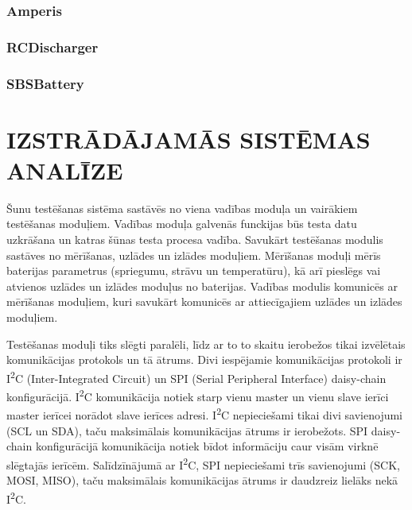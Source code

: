 \documentclass[12pt,fleqn,titlepage,oneside]{article}
\numberwithin{equation}{section}
\numberwithin{figure}{section}
\numberwithin{table}{section}
\begin{document}
\subsubsection{Amperis}

\subsubsection{RCDischarger}

\subsubsection{SBSBattery}

\clearpage
\section{\texorpdfstring{\MakeUppercase{Izstrādājamās sistēmas analīze}}{Izstrādājamās sistēmas analīze}}

Šunu testēšanas sistēma sastāvēs no viena vadības moduļa un vairākiem testēšanas moduļiem.
Vadības moduļa galvenās funckijas būs testa datu uzkrāšana un katras šūnas testa procesa vadība.
Savukārt testēšanas modulis sastāves no mērīšanas, uzlādes un izlādes moduļiem. Mērīšanas moduļi mērīs baterijas parametrus (spriegumu, strāvu un temperatūru), kā arī pieslēgs vai atvienos uzlādes un izlādes moduļus no baterijas.
Vadības modulis komunicēs ar mērīšanas moduļiem, kuri savukārt komunicēs ar attiecīgajiem uzlādes un izlādes moduļiem. 

Testēšanas moduļi tiks slēgti paralēli, līdz ar to to skaitu ierobežos tikai izvēlētais komunikācijas protokols un tā ātrums.
Divi iespējamie komunikācijas protokoli ir I\textsuperscript{2}C (Inter-Integrated Circuit) un SPI (Serial Peripheral Interface) daisy-chain konfigurācijā.
I\textsuperscript{2}C komunikācija notiek starp vienu master un vienu slave ierīci master ierīcei norādot slave ierīces adresi.
I\textsuperscript{2}C nepieciešami tikai divi savienojumi (SCL un SDA), taču maksimālais komunikācijas ātrums ir ierobežots.
SPI daisy-chain konfigurācijā komunikācija notiek bīdot informāciju caur visām virknē slēgtajās ierīcēm. Salīdzīnājumā ar I\textsuperscript{2}C, SPI nepieciešami trīs savienojumi (SCK, MOSI, MISO), taču maksimālais komunikācijas ātrums ir daudzreiz lielāks nekā I\textsuperscript{2}C.
\end{document}
